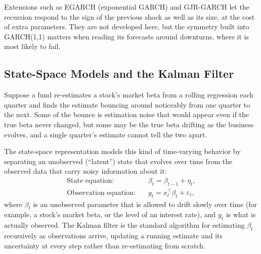 \documentclass[../ai_in_finance]{subfiles}
\begin{document}
Extensions such as EGARCH (exponential GARCH) and GJR-GARCH let the recursion respond to the sign of the previous shock as well as its size, at the cost of extra parameters. They are not developed here, but the symmetry built into GARCH(1,1) matters when reading its forecasts around downturns, where it is most likely to fail.

\subsection{State-Space Models and the Kalman Filter}
\label{sec:kalman-example}

Suppose a fund re-estimates a stock's market beta from a rolling regression each quarter and finds the estimate bouncing around noticeably from one quarter to the next. Some of the bounce is estimation noise that would appear even if the true beta never changed, but some may be the true beta drifting as the business evolves, and a single quarter's estimate cannot tell the two apart.

The state-space representation models this kind of time-varying behavior by separating an unobserved (``latent'') state that evolves over time from the observed data that carry noisy information about it:
\begin{align*}
\text{State equation:} \quad & \beta_t = \beta_{t-1} + \eta_t, \\
\text{Observation equation:} \quad & y_t = x_t^\top \beta_t + \varepsilon_t,
\end{align*}
where $\beta_t$ is an unobserved parameter that is allowed to drift slowly over time (for example, a stock's market beta, or the level of an interest rate), and $y_t$ is what is actually observed. The Kalman filter is the standard algorithm for estimating $\beta_t$ recursively as observations arrive, updating a running estimate and its uncertainty at every step rather than re-estimating from scratch.
\end{document}

